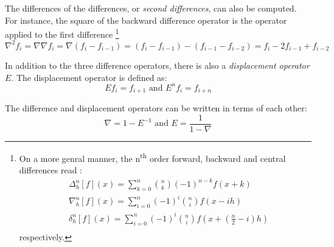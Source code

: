 The differences of the
differences, or \emph{second differences}, can also be computed. For instance,
the square of the backward difference operator is the operator applied to the first
difference \footnote{
  On a more genral manner, the n\textsuperscript{th} order forward, backward and central differences read :
\begin{equation}
  \begin{aligned}
  & {\Delta}^n_h [f](x) = \sum_{k=0}^n \binom{n}{k} (-1)^{n-k} f(x+k)\\
  & {\nabla}^n_h [f](x) = \sum_{i=0}^n (-1)^i \binom{n}{i} f(x-ih)\\
  & {\delta}^n_h [f](x) = \sum_{i=0}^n (-1)^i \binom{n}{i} f(x + (\frac{n}{2} -i)h)\\
  \end{aligned}
\end{equation}
respectively.}
\begin{equation}
  {\nabla}^2 f_i = \nabla \nabla f_i = \nabla (f_i - f_{i-1}) = 
  (f_i - f_{i-1}) - (f_{i-1} - f_{i-2}) = f_i - 2 f_{i-1} + f_{i-2}
\end{equation}

In addition to the three difference operators, there is also a 
\emph{displacement operator} \(E\). The displacement operator is defined as:
\begin{equation}
  E f_i = f_{i+1} \text{ and } E^n f_i = f_{i+n}
\end{equation}

The difference and displacement operators  can be written in terms of each other:
\begin{equation}
\label{eq:berry6}
  \nabla = 1 - E^{-1} \text{ and } E = \frac{1}{1 - \nabla}
\end{equation}

